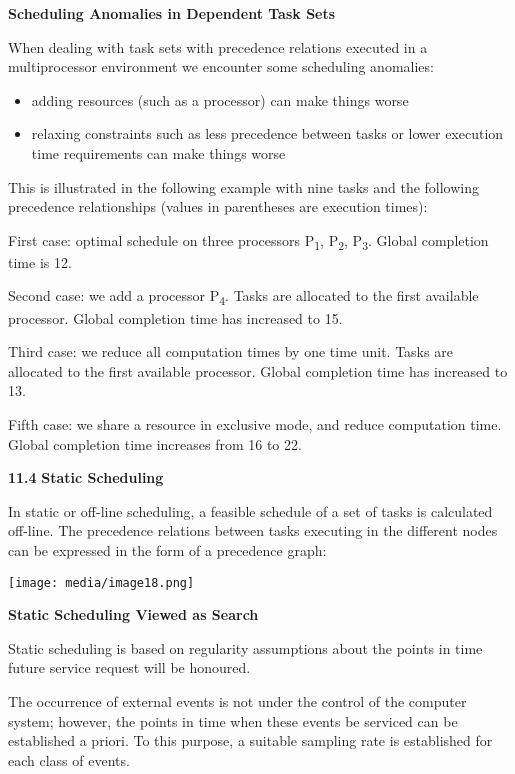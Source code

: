 \textbf{Scheduling Anomalies in Dependent Task Sets}

When dealing with task sets with precedence relations executed in a
multiprocessor environment we encounter some scheduling anomalies:

\begin{itemize}
\item
  adding resources (such as a processor) can make things worse
\item
  relaxing constraints such as less precedence between tasks or lower
  execution time requirements can make things worse
\end{itemize}

This is illustrated in the following example with nine tasks and the
following precedence relationships (values in parentheses are execution
times):

First case: optimal schedule on three processors P\textsubscript{1},
P\textsubscript{2}, P\textsubscript{3}. Global completion time is 12.

Second case: we add a processor P\textsubscript{4}. Tasks are allocated
to the first available processor. Global completion time has increased
to 15.

Third case: we reduce all computation times by one time unit. Tasks are
allocated to the first available processor. Global completion time has
increased to 13.

Fifth case: we share a resource in exclusive mode, and reduce
computation time. Global completion time increases from 16 to 22.

\textbf{11.4} \protect\hypertarget{teil5}{}{}\textbf{Static Scheduling}

In static or off-line scheduling, a feasible schedule of a set of tasks
is calculated off-line. The precedence relations between tasks executing
in the different nodes can be expressed in the form of a precedence
graph:

\texttt{[image: media/image18.png]}

\textbf{Static Scheduling Viewed as Search}

Static scheduling is based on regularity assumptions about the points in
time future service request will be honoured.

The occurrence of external events is not under the control of the
computer system; however, the points in time when these events be
serviced can be established a priori. To this purpose, a suitable
sampling rate is established for each class of events.

